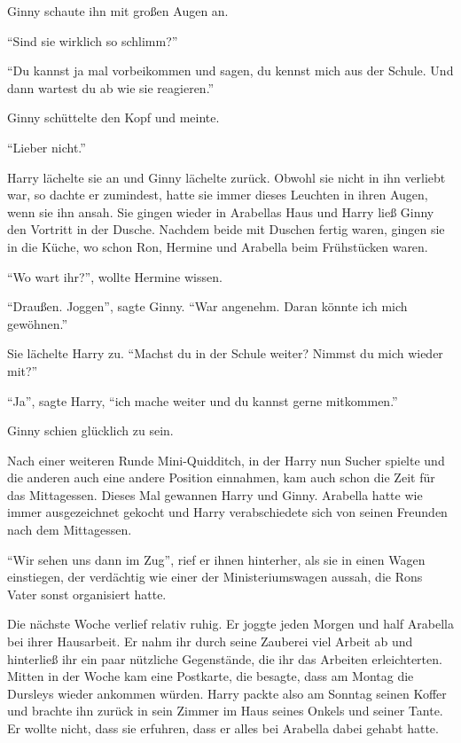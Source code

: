Ginny schaute ihn mit großen Augen an.

\enquote{Sind sie wirklich so schlimm?}

\enquote{Du kannst ja mal vorbeikommen und sagen, du kennst mich aus der Schule. Und dann wartest du ab wie sie reagieren.}

Ginny schüttelte den Kopf und meinte.

\enquote{Lieber nicht.}

Harry lächelte sie an und Ginny lächelte zurück. Obwohl sie nicht in ihn verliebt war, so dachte er zumindest, hatte sie immer dieses Leuchten in ihren Augen, wenn sie ihn ansah. Sie gingen wieder in Arabellas Haus und Harry ließ Ginny den Vortritt in der Dusche. Nachdem beide mit Duschen fertig waren, gingen sie in die Küche, wo schon Ron, Hermine und Arabella beim Frühstücken waren.

\enquote{Wo wart ihr?}, wollte Hermine wissen.

\enquote{Draußen. Joggen}, sagte Ginny. \enquote{War angenehm. Daran könnte ich mich gewöhnen.}

Sie lächelte Harry zu. \enquote{Machst du in der Schule weiter? Nimmst du mich wieder mit?}

\enquote{Ja}, sagte Harry, \enquote{ich mache weiter und du kannst gerne mitkommen.}

Ginny schien glücklich zu sein.

Nach einer weiteren Runde Mini-Quidditch, in der Harry nun Sucher spielte und die anderen auch eine andere Position einnahmen, kam auch schon die Zeit für das Mittagessen. Dieses Mal gewannen Harry und Ginny.  Arabella hatte wie immer ausgezeichnet gekocht und Harry verabschiedete sich von seinen Freunden nach dem Mittagessen.

\enquote{Wir sehen uns dann im Zug}, rief er ihnen hinterher, als sie in einen Wagen einstiegen, der verdächtig wie einer der Ministeriumswagen aussah, die Rons Vater sonst organisiert hatte.

Die nächste Woche verlief relativ ruhig. Er joggte jeden Morgen und half Arabella bei ihrer Hausarbeit. Er nahm ihr durch seine Zauberei viel Arbeit ab und hinterließ ihr ein paar nützliche Gegenstände, die ihr das Arbeiten erleichterten. Mitten in der Woche kam eine Postkarte, die besagte, dass am Montag die Dursleys wieder ankommen würden. Harry packte also am Sonntag seinen Koffer und brachte ihn zurück in sein Zimmer im Haus seines Onkels und seiner Tante. Er wollte nicht, dass sie erfuhren, dass er alles bei Arabella dabei gehabt hatte.

